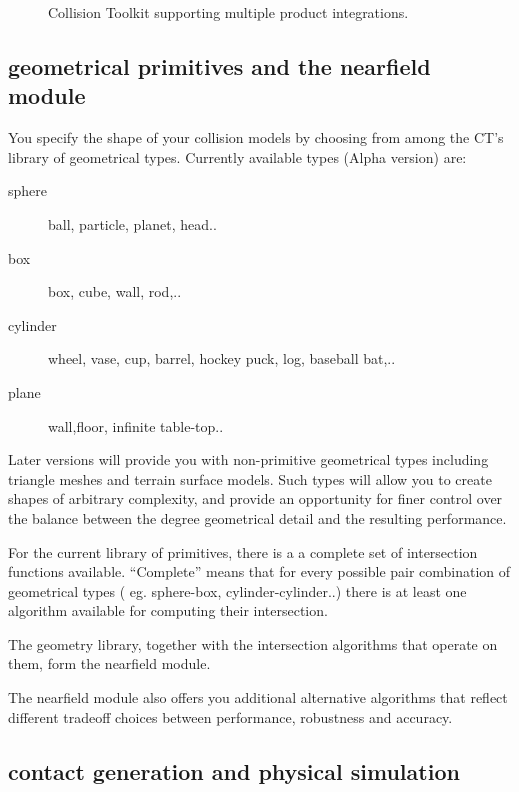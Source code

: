 \documentclass[11pt]{article}
\begin{document}
\begin{figure}[h!]
\centerline{}
\caption{ Collision Toolkit supporting multiple product integrations.
} 
\label{fig:cd_dt_others} 
\end{figure}





\subsection{ geometrical primitives and the nearfield module }

You specify the shape of your collision models by choosing from among the
CT's library of geometrical types.
Currently available types (Alpha version) are:

\begin{description}
\item[sphere] ball, particle, planet, head..  
\item[box] box, cube, wall, rod,..
\item[cylinder] wheel, vase, cup, barrel, hockey puck, log, baseball bat,.. 
\item[plane] wall,floor, infinite table-top..
\end{description}

Later versions will provide you with non-primitive geometrical types
including triangle meshes and terrain surface models. Such types will allow
you to create shapes of arbitrary complexity, and provide an opportunity
for finer control over the balance between 
the degree geometrical detail and the resulting performance.

For the current library of primitives, there is a
a complete set of intersection functions available.
``Complete'' means that for every possible pair combination of geometrical
types ( eg. sphere-box, cylinder-cylinder..) there is at least one
algorithm available for computing their intersection.

The geometry library, together with the intersection algorithms that
operate on them, form the nearfield module.

The nearfield module also offers you
additional 
alternative algorithms 
that reflect different tradeoff choices
between performance, robustness and accuracy.

\subsection{ contact generation and physical simulation }
\end{document}
